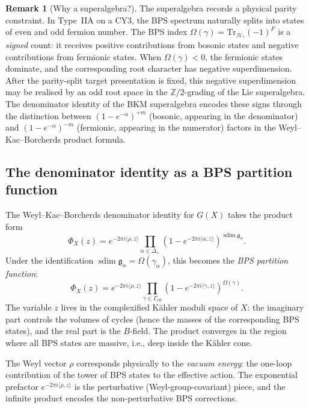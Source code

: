 \documentclass[11pt]{article}
\theoremstyle{definition}
\newtheorem{remark}[theorem]{Remark}
\newcommand{\Tr}{\mathrm{Tr}}
\newcommand{\sdim}{\operatorname{sdim}}
\newcommand{\bZ}{\mathbb{Z}}
\begin{document}
\begin{remark}[Why a superalgebra?]
The superalgebra records a physical parity constraint. In Type~IIA on a CY3, the BPS spectrum
naturally splits into states of even and odd fermion number. The BPS
index $\Omega(\gamma) = \Tr_{\mathcal{H}_\gamma}(-1)^F$ is a
\emph{signed} count: it receives positive contributions from bosonic
states and negative contributions from fermionic states. When
$\Omega(\gamma) < 0$, the fermionic states dominate, and the
corresponding root character has negative superdimension. After the
parity-split target presentation is fixed, this negative superdimension
may be realised by an odd root space in the $\bZ/2$-grading of the Lie
superalgebra. The denominator identity of the BKM superalgebra
encodes these signs through the distinction between $(1-e^{-\alpha})^{+m}$
(bosonic, appearing in the denominator) and
$(1-e^{-\alpha})^{-m}$ (fermionic, appearing in the numerator) factors
in the Weyl--Kac--Borcherds product formula.
\end{remark}

\subsection{The denominator identity as a BPS partition function}

The Weyl--Kac--Borcherds denominator identity for $G(X)$ takes the
product form
\begin{equation}
\label{eq:denominator-product}
 \Phi_X(z) = e^{-2\pi i \langle \rho, z \rangle}
 \prod_{\alpha \in \Delta_+}
 (1 - e^{-2\pi i \langle \alpha, z \rangle})^{\sdim\mathfrak g_\alpha}.
\end{equation}
Under the identification \(\sdim\mathfrak g_\alpha = \Omega(\gamma_\alpha)\),
this becomes the \emph{BPS partition function}:
\[
 \Phi_X(z) = e^{-2\pi i \langle \rho, z \rangle}
 \prod_{\gamma \in \Gamma_{\mathrm{eff}}}
 (1 - e^{-2\pi i \langle \gamma, z \rangle})^{\Omega(\gamma)}.
\]
The variable $z$ lives in the complexified K\"ahler moduli space of
$X$: the imaginary part controls the volumes of cycles (hence the
masses of the corresponding BPS states), and the real part is the
$B$-field. The product converges in the region where all BPS states
are massive, i.e., deep inside the K\"ahler cone.

The Weyl vector $\rho$ corresponds physically to the \emph{vacuum
energy}: the one-loop contribution of the tower of BPS states to the
effective action. The exponential prefactor $e^{-2\pi i \langle \rho,
z \rangle}$ is the perturbative (Weyl-group-covariant) piece, and the
infinite product encodes the non-perturbative BPS corrections.
\end{document}
